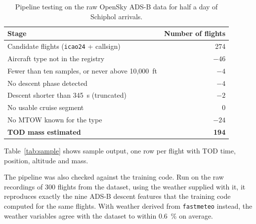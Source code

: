 \documentclass[
  manuscript=proceedings,  %
  layout=preprint,  %
  year=2026,
  volume=x,
]{extra/joas}
\begin{document}
\begin{table}[!ht]
    \centering
    \small
    \begin{tabular}{@{}lr@{}}
    \toprule
    \textbf{Stage} & \textbf{Number of flights} \\
    \midrule
    Candidate flights (\texttt{icao24} + callsign) & 274 \\
    \midrule
    Aircraft type not in the registry & $-46$ \\
    Fewer than ten samples, or never above 10{,}000~ft & $-4$ \\
    No descent phase detected & $-4$ \\
    Descent shorter than 345~s (truncated) & $-2$ \\
    No usable cruise segment & $0$ \\
    No MTOW known for the type & $-24$ \\
    \midrule
    \textbf{TOD mass estimated} & \textbf{194} \\
    \bottomrule
    \end{tabular}
    \caption{Pipeline testing on the raw OpenSky ADS-B data for half a day of Schiphol arrivals.}
    \label{tab:funnel}
\end{table}

Table~\ref{tab:sample} shows sample output, one row per flight with TOD time, position, altitude and mass.



The pipeline was also checked against the training code. Run on the raw recordings of 300 flights from the dataset, using the weather supplied with it, it reproduces exactly the nine ADS-B descent features that the training code computed for the same flights. With weather derived from \texttt{fastmeteo} instead, the weather variables agree with the dataset to within 0.6~\% on average.
\end{document}
